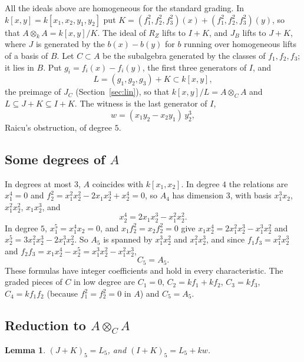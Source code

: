 \documentclass[11pt,a4paper]{amsart}
\newtheorem{lemma}[theorem]{Lemma}
\theoremstyle{remark}
\begin{document}
All the ideals above are homogeneous for the standard grading. In $k[x, y] = k[x_1, x_2, y_1, y_2]$ put $K = (f_1^2, f_2^2, f_3^2)(x) + (f_1^2, f_2^2, f_3^2)(y)$, so that $A \otimes_k A = k[x, y]/K$. The ideal of $R_Z$ lifts to $I + K$, and $J_B$ lifts to $J + K$, where $J$ is generated by the $b(x) - b(y)$ for $b$ running over homogeneous lifts of a basis of $B$. Let $C \subset A$ be the subalgebra generated by the classes of $f_1, f_2, f_3$; it lies in $B$. Put $g_i = f_i(x) - f_i(y)$, the first three generators of $I$, and
\[
L = (g_1, g_2, g_3) + K \subset k[x, y],
\]
the preimage of $J_C$ (Section~\ref{sec:lin}), so that $k[x, y]/L = A \otimes_C A$ and $L \subseteq J + K \subseteq I + K$. The witness is the last generator of $I$,
\[
w = (x_1y_2 - x_2y_1)\,y_2^3,
\]
Raicu's obstruction, of degree $5$.

\subsection{Some degrees of $A$}
In degrees at most $3$, $A$ coincides with $k[x_1, x_2]$. In degree $4$ the relations are $x_1^4 = 0$ and $f_2^2 = x_1^2x_2^2 - 2x_1x_2^3 + x_2^4 = 0$, so $A_4$ has dimension $3$, with basis $x_1^3x_2$, $x_1^2x_2^2$, $x_1x_2^3$, and
\begin{equation}\label{eq:A4}
x_2^4 = 2x_1x_2^3 - x_1^2x_2^2.
\end{equation}
In degree $5$, $x_1^5 = x_1^4x_2 = 0$, and $x_1 f_2^2 = x_2 f_2^2 = 0$ give $x_1x_2^4 = 2x_1^2x_2^3 - x_1^3x_2^2$ and $x_2^5 = 3x_1^2x_2^3 - 2x_1^3x_2^2$. So $A_5$ is spanned by $x_1^3x_2^2$ and $x_1^2x_2^3$, and since $f_1f_3 = x_1^2x_2^3$ and $f_2f_3 = x_1x_2^4 - x_2^5 = x_1^3x_2^2 - x_1^2x_2^3$,
\begin{equation}\label{eq:C5}
C_5 = A_5.
\end{equation}
These formulas have integer coefficients and hold in every characteristic. The graded pieces of $C$ in low degree are $C_1 = 0$, $C_2 = kf_1 + kf_2$, $C_3 = kf_3$, $C_4 = kf_1f_2$ (because $f_1^2 = f_2^2 = 0$ in $A$) and $C_5 = A_5$.

\subsection{Reduction to $A \otimes_C A$}

\begin{lemma}\label{lem:reduction}
$(J + K)_5 = L_5$, and $(I + K)_5 = L_5 + kw$.
\end{lemma}
\end{document}
